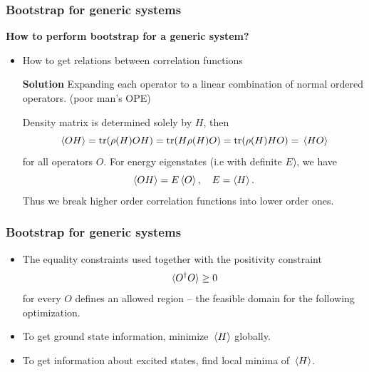\documentclass{beamer}
\begin{document}
\begin{frame}
\frametitle{Bootstrap for generic systems}

\textbf{How to perform bootstrap for a generic system?}  

\begin{itemize}
    \item How to get relations between correlation functions

    \textbf{Solution} Expanding each operator to a linear combination of normal ordered operators. (poor man's OPE)
    
    Density matrix is determined solely by $H$, then 
    \begin{equation}
        \expval*{O H} = \trace (\rho(H) O H) = \trace(H \rho(H) O) = \trace(\rho(H) H O)  = \expval*{H {O}}
    \end{equation}
    for all operators $O$. For energy eigenstates (i.e with definite $E$), we have 
    \begin{equation}
        \expval{O H} = E \expval{O}, \quad E = \expval{H}.
    \end{equation}
    Thus we break higher order correlation functions into lower order ones.
\end{itemize}

\end{frame}

\begin{frame}
\frametitle{Bootstrap for generic systems}

\begin{itemize}
    \item The equality constraints used together with the positivity constraint 
    \begin{equation}
        \expval*{O^\dagger O} \geq 0
    \end{equation}
    for every $O$ defines an allowed region -- the feasible domain for the following optimization.
    \item To get ground state information, minimize $\expval*{H}$ globally.
    \item To get information about excited states, find local minima of $\expval*{H}$.
\end{itemize} 

\begin{center}
    
\end{center}

\end{frame}
\end{document}
